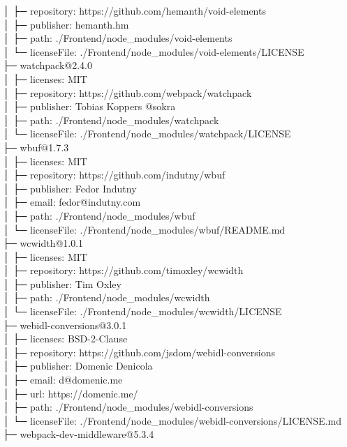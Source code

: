 │  ├─ repository: https://github.com/hemanth/void-elements\\
│  ├─ publisher: hemanth.hm\\
│  ├─ path: ./Frontend/node\_modules/void-elements\\
│  └─ licenseFile: ./Frontend/node\_modules/void-elements/LICENSE\\
├─ watchpack@2.4.0\\
│  ├─ licenses: MIT\\
│  ├─ repository: https://github.com/webpack/watchpack\\
│  ├─ publisher: Tobias Koppers @sokra\\
│  ├─ path: ./Frontend/node\_modules/watchpack\\
│  └─ licenseFile: ./Frontend/node\_modules/watchpack/LICENSE\\
├─ wbuf@1.7.3\\
│  ├─ licenses: MIT\\
│  ├─ repository: https://github.com/indutny/wbuf\\
│  ├─ publisher: Fedor Indutny\\
│  ├─ email: fedor@indutny.com\\
│  ├─ path: ./Frontend/node\_modules/wbuf\\
│  └─ licenseFile: ./Frontend/node\_modules/wbuf/README.md\\
├─ wcwidth@1.0.1\\
│  ├─ licenses: MIT\\
│  ├─ repository: https://github.com/timoxley/wcwidth\\
│  ├─ publisher: Tim Oxley\\
│  ├─ path: ./Frontend/node\_modules/wcwidth\\
│  └─ licenseFile: ./Frontend/node\_modules/wcwidth/LICENSE\\
├─ webidl-conversions@3.0.1\\
│  ├─ licenses: BSD-2-Clause\\
│  ├─ repository: https://github.com/jsdom/webidl-conversions\\
│  ├─ publisher: Domenic Denicola\\
│  ├─ email: d@domenic.me\\
│  ├─ url: https://domenic.me/\\
│  ├─ path: ./Frontend/node\_modules/webidl-conversions\\
│  └─ licenseFile: ./Frontend/node\_modules/webidl-conversions/LICENSE.md\\
├─ webpack-dev-middleware@5.3.4\\
